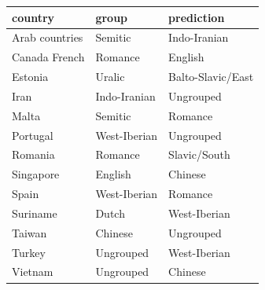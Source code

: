 \documentclass[a4paper,10pt]{article}
\begin{document}
\begin{tabular}{lll}
\toprule
country &         group &         prediction \\
\midrule
Arab countries &       Semitic &       Indo-Iranian \\
Canada French  &       Romance &            English \\
Estonia        &        Uralic &  Balto-Slavic/East \\
Iran           &  Indo-Iranian &          Ungrouped \\
Malta          &       Semitic &            Romance \\
Portugal       &  West-Iberian &          Ungrouped \\
Romania        &       Romance &       Slavic/South \\
Singapore      &       English &            Chinese \\
Spain          &  West-Iberian &            Romance \\
Suriname       &         Dutch &       West-Iberian \\
Taiwan         &       Chinese &          Ungrouped \\
Turkey         &     Ungrouped &       West-Iberian \\
Vietnam        &     Ungrouped &            Chinese \\
\bottomrule
\end{tabular}
\end{document}
